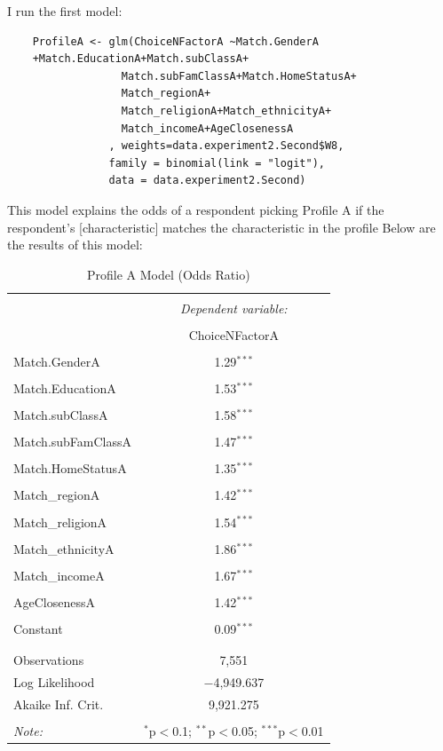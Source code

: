 \documentclass{article}
\begin{document}
I run the first model:
\begin{verbatim}
    ProfileA <- glm(ChoiceNFactorA ~Match.GenderA 
    +Match.EducationA+Match.subClassA+
                  Match.subFamClassA+Match.HomeStatusA+
                  Match_regionA+  
                  Match_religionA+Match_ethnicityA+
                  Match_incomeA+AgeClosenessA
                , weights=data.experiment2.Second$W8,
                family = binomial(link = "logit"),
                data = data.experiment2.Second)

\end{verbatim}
This model explains the odds of a respondent picking Profile A if the respondent’s [characteristic] matches the characteristic in the profile
Below are the results of this model:

\begin{table}[H] \centering 
  \caption{Profile A Model (Odds Ratio)} 
  \label{} 
\begin{tabular}{@{\extracolsep{5pt}}lc} 
\\[-1.8ex]\hline 
\hline \\[-1.8ex] 
 & \multicolumn{1}{c}{\textit{Dependent variable:}} \\ 
\cline{2-2} 
\\[-1.8ex] & ChoiceNFactorA \\ 
\hline \\[-1.8ex] 
 Match.GenderA & 1.29$^{***}$ \\ 
  & \\ 
 Match.EducationA & 1.53$^{***}$ \\ 
  & \\ 
 Match.subClassA & 1.58$^{***}$ \\ 
  & \\ 
 Match.subFamClassA & 1.47$^{***}$ \\ 
  & \\ 
 Match.HomeStatusA & 1.35$^{***}$ \\ 
  & \\ 
 Match\_regionA & 1.42$^{***}$ \\ 
  & \\ 
 Match\_religionA & 1.54$^{***}$ \\ 
  & \\ 
 Match\_ethnicityA & 1.86$^{***}$ \\ 
  & \\ 
 Match\_incomeA & 1.67$^{***}$ \\ 
  & \\ 
 AgeClosenessA & 1.42$^{***}$ \\
  & \\ 
 Constant & 0.09$^{***}$ \\ 
  & \\ 
\hline \\[-1.8ex] 
Observations & 7,551 \\ 
Log Likelihood & $-$4,949.637 \\ 
Akaike Inf. Crit. & 9,921.275 \\ 
\hline 
\hline \\[-1.8ex] 
\textit{Note:}  & \multicolumn{1}{r}{$^{*}$p$<$0.1; $^{**}$p$<$0.05; $^{***}$p$<$0.01} \\ 
\end{tabular} 
\end{table} 
\end{document}
